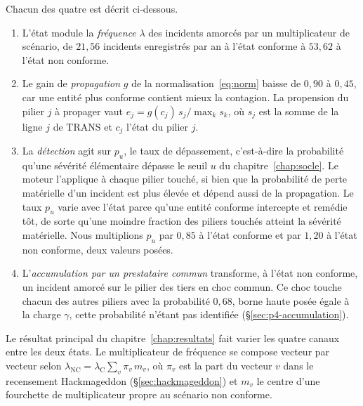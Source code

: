 Chacun des quatre est décrit ci-dessous.
\begin{enumerate}[leftmargin=1.5em,itemsep=2pt,topsep=2pt]
\item L'état module la \emph{fréquence} $\lambda$ des incidents amorcés par un multiplicateur de
  scénario, de $21{,}56$ incidents enregistrés par an à l'état conforme à $53{,}62$ à l'état non
  conforme.
\item Le gain de \emph{propagation} $g$ de la normalisation~\eqref{eq:norm} baisse de $0{,}90$ à
  $0{,}45$, car une entité plus conforme contient mieux la contagion. La propension du pilier $j$ à
  propager vaut $e_j=g(c_j)\,s_j/\max_k s_k$, où $s_j$ est la somme de la ligne $j$ de TRANS et
  $c_j$ l'état du pilier $j$.
\item La \emph{détection} agit sur $p_u$, le taux de dépassement, c'est-à-dire la probabilité
  qu'une sévérité élémentaire dépasse le seuil $u$ du chapitre~\ref{chap:socle}. Le moteur l'applique à chaque pilier touché, si bien que la probabilité de perte matérielle d'un incident est plus élevée et dépend aussi de la propagation. Le taux $p_u$ varie avec l'état parce qu'une entité conforme intercepte et remédie tôt, de sorte qu'une
  moindre fraction des piliers touchés atteint la sévérité matérielle. Nous multiplions $p_u$ par $0{,}85$
  à l'état conforme et par $1{,}20$ à l'état non conforme, deux valeurs posées.
\item L'\emph{accumulation par un prestataire commun} transforme, à l'état non conforme, un
  incident amorcé sur le pilier des tiers en choc commun. Ce choc touche chacun des autres piliers
  avec la probabilité $0{,}68$, borne haute posée égale à la charge $\gamma$, cette probabilité
  n'étant pas identifiée (\S\ref{sec:p4-accumulation}).
\end{enumerate}
Le résultat principal du chapitre~\ref{chap:resultats} fait varier les quatre canaux entre les deux états. Le multiplicateur de
fréquence se compose vecteur par vecteur selon $\lambda_{\text{NC}}=\lambda_{\text{C}}\sum_v \pi_v\,m_v$, où $\pi_v$ est la
part du vecteur $v$ dans le recensement Hackmageddon (\S\ref{sec:hackmageddon}) et $m_v$ le centre
d'une fourchette de multiplicateur propre au scénario non conforme.

